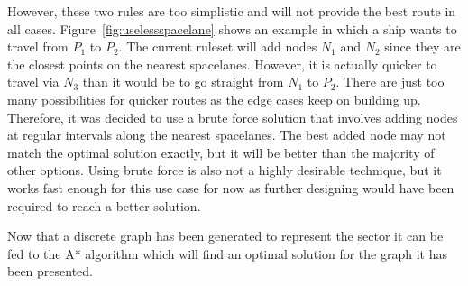 However, these two rules are too simplistic and will not provide the best route in all cases. Figure~\ref{fig:uselessspacelane} shows an example in which a ship wants to travel from $P_1$ to $P_2$. The current ruleset will add nodes $N_1$ and $N_2$ since they are the closest points on the nearest spacelanes. However, it is actually quicker to travel via $N_3$ than it would be to go straight from $N_1$ to $P_2$. There are just too many possibilities for quicker routes as the edge cases keep on building up. Therefore, it was decided to use a brute force solution that involves adding nodes at regular intervals along the nearest spacelanes. The best added node may not match the optimal solution exactly, but it will be better than the majority of other options. Using brute force is also not a highly desirable technique, but it works fast enough for this use case for now as further designing would have been required to reach a better solution.

Now that a discrete graph has been generated to represent the sector it can be fed to the A* algorithm which will find an optimal solution for the graph it has been presented.




